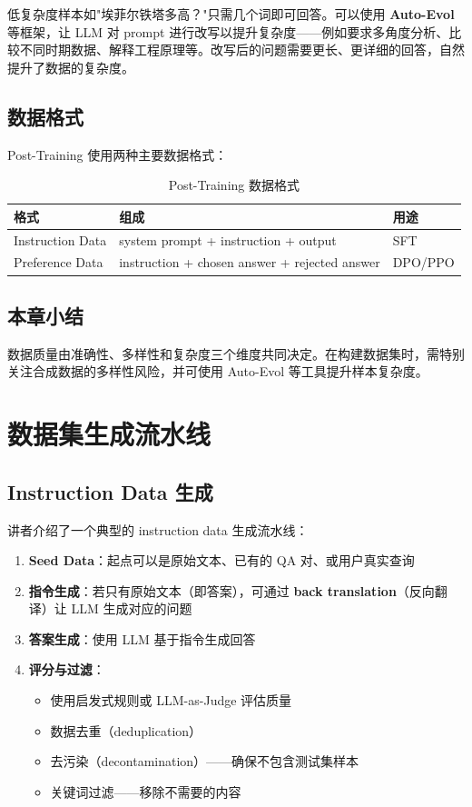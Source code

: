 \documentclass[a4paper]{article}
\begin{document}
低复杂度样本如"埃菲尔铁塔多高？"只需几个词即可回答。可以使用 \textbf{Auto-Evol} 等框架，让 LLM 对 prompt 进行改写以提升复杂度——例如要求多角度分析、比较不同时期数据、解释工程原理等。改写后的问题需要更长、更详细的回答，自然提升了数据的复杂度。

\subsection{数据格式}

Post-Training 使用两种主要数据格式：

\begin{table}[H]
\centering
\caption{Post-Training 数据格式}
\begin{tabular}{lll}
\toprule
\textbf{格式} & \textbf{组成} & \textbf{用途} \\
\midrule
Instruction Data & system prompt + instruction + output & SFT \\
Preference Data & instruction + chosen answer + rejected answer & DPO/PPO \\
\bottomrule
\end{tabular}
\end{table}

\subsection{本章小结}

数据质量由准确性、多样性和复杂度三个维度共同决定。在构建数据集时，需特别关注合成数据的多样性风险，并可使用 Auto-Evol 等工具提升样本复杂度。

\newpage
\section{数据集生成流水线}

\subsection{Instruction Data 生成}

讲者介绍了一个典型的 instruction data 生成流水线：

\begin{enumerate}
    \item \textbf{Seed Data}：起点可以是原始文本、已有的 QA 对、或用户真实查询
    \item \textbf{指令生成}：若只有原始文本（即答案），可通过 \textbf{back translation}（反向翻译）让 LLM 生成对应的问题
    \item \textbf{答案生成}：使用 LLM 基于指令生成回答
    \item \textbf{评分与过滤}：
    \begin{itemize}
        \item 使用启发式规则或 LLM-as-Judge 评估质量
        \item 数据去重（deduplication）
        \item 去污染（decontamination）——确保不包含测试集样本
        \item 关键词过滤——移除不需要的内容
    \end{itemize}
\end{enumerate}
\end{document}
